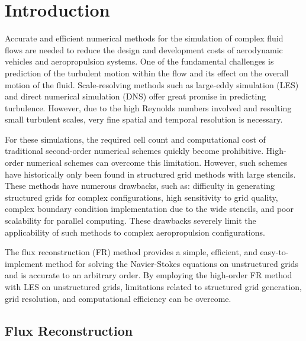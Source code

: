 \section{Introduction}
\label{SEC:Intro}

Accurate and efficient numerical methods for the simulation of complex
fluid flows are needed to reduce the design and development costs
of aerodynamic vehicles and aeropropulsion systems.
%
One of the fundamental challenges is prediction of the turbulent motion
within the flow and its effect on the overall motion of the fluid.
%
Scale-resolving methods such as
large-eddy simulation (LES) and
direct numerical simulation (DNS)
offer great promise in predicting turbulence.
%
However, due to the high Reynolds numbers involved
and resulting small turbulent scales,
very fine spatial and temporal resolution is necessary.


For these simulations, the required cell count and computational cost
of traditional second-order numerical schemes quickly become prohibitive.
%
High-order numerical schemes can overcome this limitation.
However, such schemes have historically only been found in structured grid
methods with large stencils.
%
These methods have numerous drawbacks, such as:
difficulty in generating structured grids for complex configurations,
high sensitivity to grid quality,
complex boundary condition implementation due to the wide stencils, and
poor scalability for parallel computing.
%
These drawbacks severely limit the applicability of such methods to
complex aeropropulsion configurations.


The flux reconstruction (FR) method provides a simple, efficient, and
easy-to-implement method for solving the Navier-Stokes equations on
unstructured grids and is accurate to an arbitrary order.
%
By employing the high-order FR method with LES
on unstructured grids, limitations related to structured grid generation,
grid resolution, and computational efficiency can be overcome.


\subsection{Flux Reconstruction}
\label{SEC:Intro:FR}

